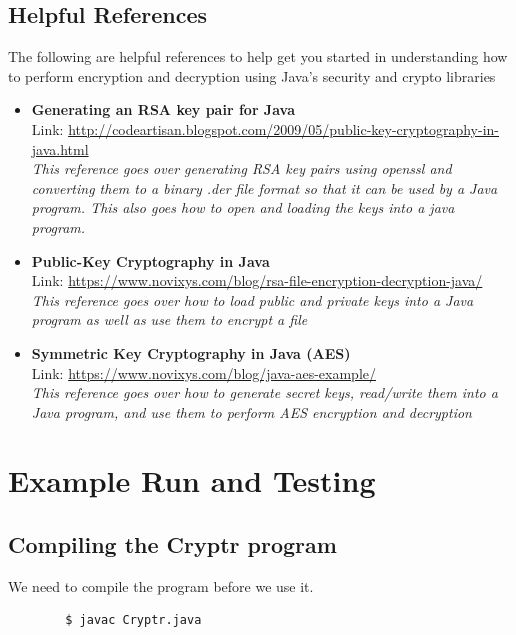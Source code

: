 \documentclass{article}
\begin{document}
\subsection*{Helpful References}
The following are helpful references to help get you started in understanding how to perform encryption and decryption using Java's security and crypto libraries
\begin{itemize}
\item \textbf{Generating an RSA key pair for Java} \\
Link:  \href{http://codeartisan.blogspot.com/2009/05/public-key-cryptography-in-java.html}{http://codeartisan.blogspot.com/2009/05/public-key-cryptography-in-java.html}\\
\textit{This reference goes over generating RSA key pairs using openssl and converting them to a binary .der file format so that it can be used by a Java program. This also goes how to open and loading the keys into a java program.}
\item \textbf{Public-Key Cryptography in Java}\\ 
Link: \href{https://www.novixys.com/blog/rsa-file-encryption-decryption-java/}{https://www.novixys.com/blog/rsa-file-encryption-decryption-java/}\\
\textit{This reference goes over how to load public and private keys into a Java program as well as use them to encrypt a file}
\item \textbf{Symmetric Key Cryptography in Java (AES)}\\
Link: \href{https://www.novixys.com/blog/java-aes-example/}{https://www.novixys.com/blog/java-aes-example/}\\
\textit{This reference goes over how to generate secret keys, read/write them into a Java program, and use them to perform AES encryption and decryption}
\end{itemize}



\section*{Example Run and Testing}
\subsection*{Compiling the Cryptr program}
We need to compile the program before we use it. 
\begin{commandline}
	\begin{verbatim}
		$ javac Cryptr.java
	\end{verbatim}
\end{commandline}
\end{document}
